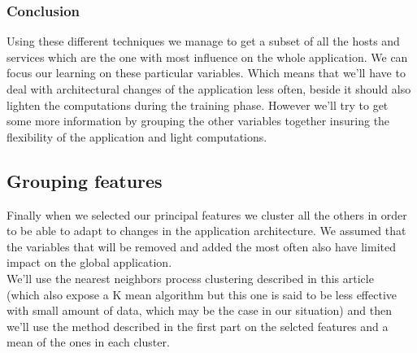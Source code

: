 \documentclass[10pt,a4paper,oneside]{article}
\begin{document}
\begin{multicols}{2}
\subsubsection{Conclusion}
Using these different techniques we manage to get a subset of all the hosts and services which are the one with most influence on the whole application. We can focus our learning on these particular variables. Which means that we'll have to deal with architectural changes of the application less often, beside it should also lighten the computations during the training phase. However we'll try to get some more information by grouping the other variables together insuring the flexibility of the application and light computations.\\
\subsection{Grouping features}
Finally when we selected our principal features we cluster all the others in order to be able to adapt to changes in the application architecture. We assumed that the variables that will be removed and added the most often also have limited impact on the global application.\\
We'll use the nearest neighbors process clustering described in this article ~\cite{ref5} (which also expose a K mean algorithm but this one is said to be less effective with small amount of data, which may be the case in our situation) and then we'll use the method described in the first part on the selcted features and a mean of the ones in each cluster.

\end{multicols}

\vspace{0.8cm}

{}

\end{document}
